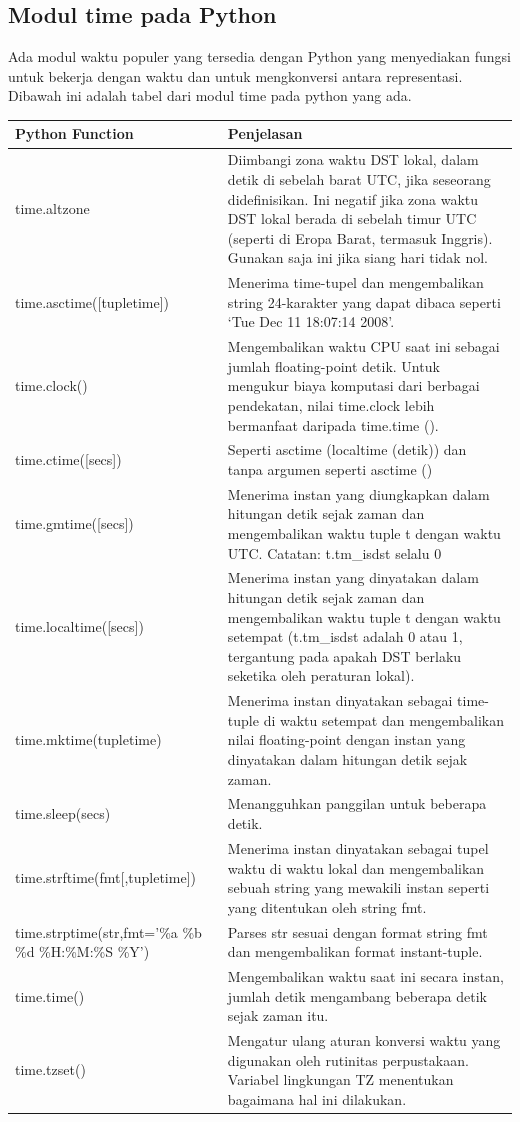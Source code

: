 \subsection{Modul time pada Python}
Ada modul waktu populer yang tersedia dengan Python yang menyediakan fungsi untuk bekerja dengan waktu dan untuk mengkonversi antara representasi. Dibawah ini adalah tabel dari modul time pada python yang ada.
\begin{center}
\begin{tabular}{ | m{4cm} | m{4cm} | }
\hline
Python Function & Penjelasan \\
\hline
time.altzone & Diimbangi zona waktu DST lokal, dalam detik di sebelah barat UTC, jika seseorang didefinisikan. Ini negatif jika zona waktu DST lokal berada di sebelah timur UTC (seperti di Eropa Barat, termasuk Inggris). Gunakan saja ini jika siang hari tidak nol. \\
\hline
time.asctime([tupletime]) & Menerima time-tupel dan mengembalikan string 24-karakter yang dapat dibaca seperti ‘Tue Dec 11 18:07:14 2008’. \\
\hline
time.clock() & Mengembalikan waktu CPU saat ini sebagai jumlah floating-point detik. Untuk mengukur biaya komputasi dari berbagai pendekatan, nilai time.clock lebih bermanfaat daripada time.time (). \\
\hline
time.ctime([secs]) & Seperti asctime (localtime (detik)) dan tanpa argumen seperti asctime () \\
\hline
time.gmtime([secs]) & Menerima instan yang diungkapkan dalam hitungan detik sejak zaman dan mengembalikan waktu tuple t dengan waktu UTC. Catatan: t.tm\_isdst selalu 0 \\
\hline
time.localtime([secs]) & Menerima instan yang dinyatakan dalam hitungan detik sejak zaman dan mengembalikan waktu tuple t dengan waktu setempat (t.tm\_isdst adalah 0 atau 1, tergantung pada apakah DST berlaku seketika oleh peraturan lokal). \\
\hline
time.mktime(tupletime) & Menerima instan dinyatakan sebagai time-tuple di waktu setempat dan mengembalikan nilai floating-point dengan instan yang dinyatakan dalam hitungan detik sejak zaman. \\
\hline
time.sleep(secs) & Menangguhkan panggilan untuk beberapa detik. \\
\hline
time.strftime(fmt[,tupletime]) & Menerima instan dinyatakan sebagai tupel waktu di waktu lokal dan mengembalikan sebuah string yang mewakili instan seperti yang ditentukan oleh string fmt. \\
\hline
time.strptime(str,fmt=’\%a \%b \%d \%H:\%M:\%S \%Y’) & Parses str sesuai dengan format string fmt dan mengembalikan format instant-tuple. \\
\hline
time.time() & Mengembalikan waktu saat ini secara instan, jumlah detik mengambang beberapa detik sejak zaman itu. \\
\hline
time.tzset() & Mengatur ulang aturan konversi waktu yang digunakan oleh rutinitas perpustakaan. Variabel lingkungan TZ menentukan bagaimana hal ini dilakukan. \\
\hline
\end{tabular}
\end{center}


